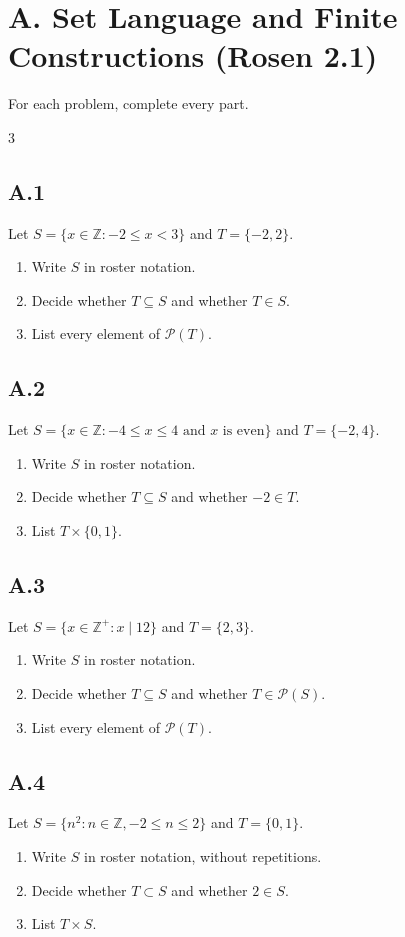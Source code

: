 \documentclass{article}
\begin{document}
\small
\raggedcolumns


\section*{A. Set Language and Finite Constructions (Rosen 2.1)}

For each problem, complete every part.

\begin{multicols}{3}
\subsection*{A.1}
Let $S=\{x\in\mathbb Z:-2\le x<3\}$ and $T=\{-2,2\}$.
\begin{enumerate}[label=(\alph*)]
  \item Write $S$ in roster notation.
  \item Decide whether $T\subseteq S$ and whether $T\in S$.
  \item List every element of $\mathcal P(T)$.
\end{enumerate}

\subsection*{A.2}
Let $S=\{x\in\mathbb Z:-4\le x\le4\text{ and }x\text{ is even}\}$ and
$T=\{-2,4\}$.
\begin{enumerate}[label=(\alph*)]
  \item Write $S$ in roster notation.
  \item Decide whether $T\subseteq S$ and whether $-2\in T$.
  \item List $T\times\{0,1\}$.
\end{enumerate}

\subsection*{A.3}
Let $S=\{x\in\mathbb Z^+:x\mid12\}$ and $T=\{2,3\}$.
\begin{enumerate}[label=(\alph*)]
  \item Write $S$ in roster notation.
  \item Decide whether $T\subseteq S$ and whether $T\in\mathcal P(S)$.
  \item List every element of $\mathcal P(T)$.
\end{enumerate}

\subsection*{A.4}
Let $S=\{n^2:n\in\mathbb Z,-2\le n\le2\}$ and $T=\{0,1\}$.
\begin{enumerate}[label=(\alph*)]
  \item Write $S$ in roster notation, without repetitions.
  \item Decide whether $T\subset S$ and whether $2\in S$.
  \item List $T\times S$.
\end{enumerate}


\end{multicols}
\end{document}
